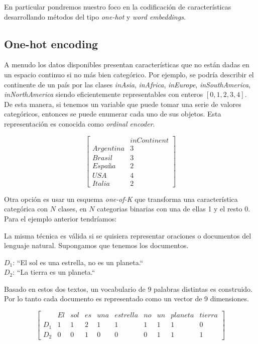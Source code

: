 En particular pondremos nuestro foco en la codificación de características
desarrollando métodos del tipo \emph{one-hot} y \emph{word embeddings}.

\subsection{One-hot encoding}
\label{method:ohe}

A menudo los datos disponibles presentan características que no están dadas en
un espacio continuo si no más bien categórico. Por ejemplo, se podría describir
el continente de un país por las clases \emph{inAsia}, \emph{inAfrica},
\emph{inEurope}, \emph{inSouthAmerica}, \emph{inNorthAmerica} siendo
eficientemente representables con enteros $[0, 1, 2, 3, 4]$. De esta manera, si
tenemos un variable que puede tomar una serie de valores categóricos, entonces
se puede enumerar cada uno de sus objetos. Esta representación es conocida como
\emph{ordinal encoder}.

\begin{equation*}
    \begin{bmatrix}
         & inContinent\\
        Argentina & 3 \\
        Brasil & 3 \\
        España & 2 \\
        USA & 4  \\
        Italia & 2 
    \end{bmatrix}
\end{equation*}

Otra opción es usar un esquema \emph{one-of-K} que transforma una característica
categórica con $N$ clases, en $N$ categorias binarias con una de ellas 1 y el
resto 0. Para el ejemplo anterior tendríamos:

La misma técnica es válida si se quisiera representar oraciones o documentos del
lenguaje natural. Supongamos que tenemos los documentos.

\begin{center}
    $D_1$: ``El sol es una estrella, no es un planeta.`` \\
    $D_2$: ``La tierra es un planeta.``    
\end{center}

Basado en  estos dos textos, un vocabulario de 9 palabras distintas es
construido. Por lo tanto cada documento es representado como un vector de 9
dimensiones.

\begin{equation*}
    \begin{bmatrix}
        & El & sol & es & una & estrella & no & un & planeta & tierra \\
        D_1 & 1 & 1 & 2 & 1 & 1 & 1 & 1 & 1 & 0  \\
        D_2 & 0 & 0 & 1 & 0 & 0 & 0 & 1 & 1 & 1 
    \end{bmatrix}
\end{equation*}

